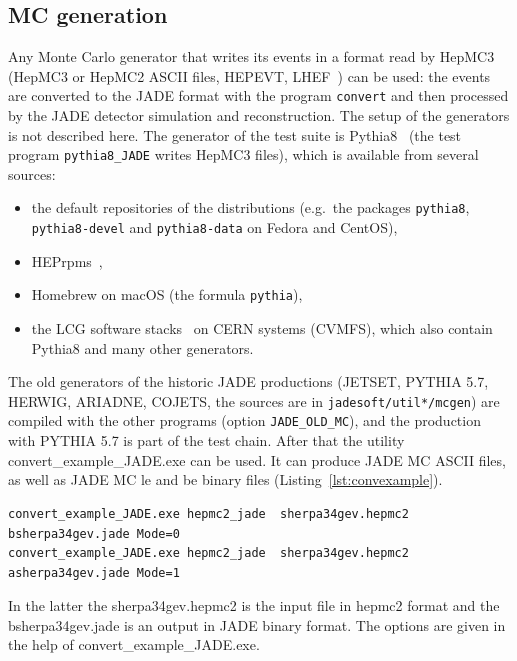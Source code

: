 \subsection{MC generation}

Any Monte Carlo generator that writes its events in a format read by HepMC3~\cite{Buckley:2019xhk}
(HepMC3 or HepMC2 ASCII files, HEPEVT, LHEF~\cite{Alwall:2006yp}) can be used: the events are converted to the JADE format with the
program \texttt{convert} and then processed by the JADE detector simulation and reconstruction. The setup of
the generators is not described here. The generator of the test suite is Pythia8~\cite{Bierlich:2022pfr}
(the test program \texttt{pythia8\_\allowbreak{}JADE} writes HepMC3 files), which is available from several sources:
\begin{itemize}
\item the default repositories of the distributions (e.g.\ the packages \texttt{pythia8}, \texttt{pythia8-devel}
and \texttt{pythia8-data} on Fedora and CentOS),
\item HEPrpms~\cite{Hahn:2022hrpms},
\item Homebrew on macOS (the formula \texttt{pythia}),
\item the LCG software stacks~\cite{LCG:web} on CERN systems (CVMFS), which also contain Pythia8 and many other
generators.
\end{itemize}
The old generators of the historic JADE productions (JETSET, PYTHIA 5.7, HERWIG, ARIADNE, COJETS, the sources are in
\texttt{jadesoft/\allowbreak{}util*/\allowbreak{}mcgen}) are compiled with the other programs (option \texttt{JADE\_\allowbreak{}OLD\_\allowbreak{}MC}), and the
production with PYTHIA 5.7 is part of the test chain.
After that the utility convert\_example\_JADE.exe can be used.
It can produce JADE MC ASCII  files, as well as JADE MC le and be binary files (Listing~\ref{lst:convexample}).

\begin{lstlisting}[basicstyle=\ttfamily\scriptsize,caption={Conversion of HepMC2 events with the program of 2016 (now \texttt{convert\_\allowbreak{}hepmc\_\allowbreak{}to\_\allowbreak{}jade}).},label={lst:convexample}]
convert_example_JADE.exe hepmc2_jade  sherpa34gev.hepmc2   bsherpa34gev.jade Mode=0
convert_example_JADE.exe hepmc2_jade  sherpa34gev.hepmc2   asherpa34gev.jade Mode=1
\end{lstlisting}
In the latter the sherpa34gev.hepmc2 is the input file in hepmc2 format and the bsherpa34gev.jade is an output in JADE binary format.
The options are given in the help of convert\_example\_JADE.exe.

